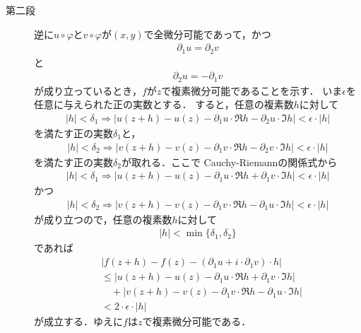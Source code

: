 \begin{sketch}
\begin{description}
			\item[第二段]
				逆に$u \circ \varphi$と$v \circ \varphi$が$(x,y)$で全微分可能であって，かつ
				\begin{align}
					\partial_1 u = \partial_2 v
				\end{align}
				と
				\begin{align}
					\partial_2 u = -\partial_1 v
				\end{align}
				が成り立っているとき，$f$が$z$で複素微分可能であることを示す．
				いま$\epsilon$を任意に与えられた正の実数とする．
				すると，任意の複素数$h$に対して
				\begin{align}
					|h| < \delta_1 \Longrightarrow
					\left|u(z+h) - u(z) - \partial_1 u \cdot \Re{h} - \partial_2 u \cdot \Im{h}\right| < \epsilon \cdot |h|
				\end{align}
				を満たす正の実数$\delta_1$と，
				\begin{align}
					|h| < \delta_2 \Longrightarrow
					\left|v(z+h) - v(z) - \partial_1 v \cdot \Re{h} - \partial_2 v \cdot \Im{h}\right| < \epsilon \cdot |h|
				\end{align}
				を満たす正の実数$\delta_2$が取れる．ここで
				Cauchy-Riemannの関係式から
				\begin{align}
					|h| < \delta_1 \Longrightarrow
					\left|u(z+h) - u(z) - \partial_1 u \cdot \Re{h} + \partial_1 v \cdot \Im{h}\right| < \epsilon \cdot |h|
				\end{align}
				かつ
				\begin{align}
					|h| < \delta_2 \Longrightarrow
					\left|v(z+h) - v(z) - \partial_1 v \cdot \Re{h} - \partial_1 u \cdot \Im{h}\right| < \epsilon \cdot |h|
				\end{align}
				が成り立つので，任意の複素数$h$に対して
				\begin{align}
					|h| < \min{\{\delta_1,\delta_2\}}
				\end{align}
				であれば
				\begin{align}
					&\left|f(z+h) - f(z) - (\partial_1 u + i \cdot \partial_1 v) \cdot h\right| \\
					&\leq \left|u(z+h) - u(z) - \partial_1 u \cdot \Re{h} + \partial_1 v \cdot \Im{h}\right| \\
					&\quad + \left|v(z+h) - v(z) - \partial_1 v \cdot \Re{h} - \partial_1 u \cdot \Im{h}\right| \\
					&< 2 \cdot \epsilon \cdot |h|
				\end{align}
				が成立する．ゆえに$f$は$z$で複素微分可能である．
				\QED
		\end{description}
	\end{sketch}